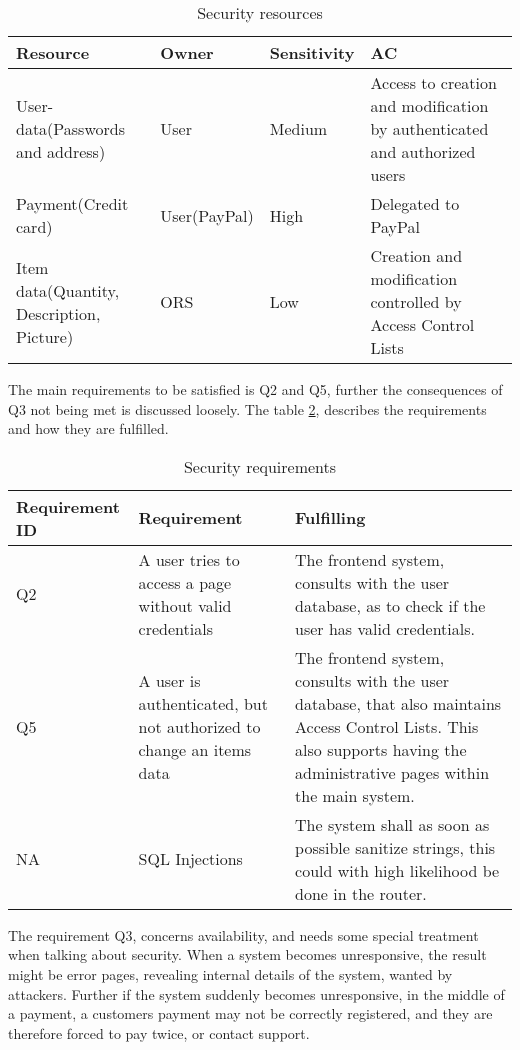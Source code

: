 \begin{table}[ht]
    \centering
    \begin{tabular}{p{3cm} | l | l | p{4cm}}
        Resource & Owner & Sensitivity & AC \\ \hline
        User-data(Passwords and address) & User & Medium & Access to creation
            and modification by authenticated and authorized users \\ \hline
        Payment(Credit card) & User(PayPal) & High & Delegated to 
            PayPal \\ \hline
        Item data(Quantity, Description, Picture) & ORS & Low & Creation and
            modification controlled by Access Control Lists \\
    \end{tabular}
    \label{tab:security-resources}
    \caption{Security resources}
\end{table}

The main requirements to be satisfied is Q2 and Q5, further the consequences of
Q3 not being met is discussed loosely. The table
\ref{tab:security-requirements}, describes the requirements and how they are
fulfilled.

\begin{table}[ht]
    \centering
    \begin{tabular}{l | p{5cm} | p{7cm}}
        Requirement ID & Requirement & Fulfilling \\ \hline
        Q2 & A user tries to access a page without valid credentials &
        The frontend system, consults with the user database, as to check if the
        user has valid credentials. \\ \hline
        Q5 & A user is authenticated, but not authorized to change an items
        data & The frontend system, consults with the user database, that also
        maintains Access Control Lists. This also supports having the
        administrative pages within the main system. \\ \hline
        NA & SQL Injections & The system shall as soon as possible sanitize
            strings, this could with high likelihood be done in the router. \\
    \end{tabular}
    \label{tab:security-requirements}
    \caption{Security requirements}
\end{table}

The requirement Q3, concerns availability, and needs some special treatment
when talking about security. When a system becomes unresponsive, the result
might be error pages, revealing internal details of the system, wanted by
attackers. Further if the system suddenly becomes unresponsive, in the middle
of a payment, a customers payment may not be correctly registered, and they are
therefore forced to pay twice, or contact support.

